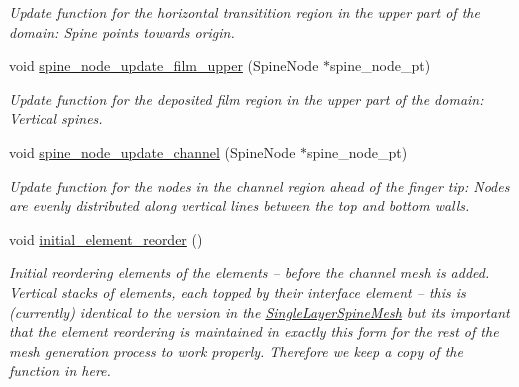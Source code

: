 \begin{DoxyCompactItemize}
\begin{DoxyCompactList}\small\item\em Update function for the horizontal transitition region in the upper part of the domain\+: Spine points towards origin. \end{DoxyCompactList}\item 
void \hyperlink{classoomph_1_1BrethertonSpineMesh_a3919bd086252db283ee5242b4688f8d1}{spine\+\_\+node\+\_\+update\+\_\+film\+\_\+upper} (Spine\+Node $\ast$spine\+\_\+node\+\_\+pt)
\begin{DoxyCompactList}\small\item\em Update function for the deposited film region in the upper part of the domain\+: Vertical spines. \end{DoxyCompactList}\item 
void \hyperlink{classoomph_1_1BrethertonSpineMesh_a5a09b6d2f5e7ffd12a0ae882754ad818}{spine\+\_\+node\+\_\+update\+\_\+channel} (Spine\+Node $\ast$spine\+\_\+node\+\_\+pt)
\begin{DoxyCompactList}\small\item\em Update function for the nodes in the channel region ahead of the finger tip\+: Nodes are evenly distributed along vertical lines between the top and bottom walls. \end{DoxyCompactList}\item 
void \hyperlink{classoomph_1_1BrethertonSpineMesh_a52ffe1a705cb720d09c831b9cf5397f6}{initial\+\_\+element\+\_\+reorder} ()
\begin{DoxyCompactList}\small\item\em Initial reordering elements of the elements -- before the channel mesh is added. Vertical stacks of elements, each topped by their interface element -- this is (currently) identical to the version in the \hyperlink{classoomph_1_1SingleLayerSpineMesh}{Single\+Layer\+Spine\+Mesh} but it\textquotesingle{}s important that the element reordering is maintained in exactly this form for the rest of the mesh generation process to work properly. Therefore we keep a copy of the function in here. \end{DoxyCompactList}\end{DoxyCompactItemize}
